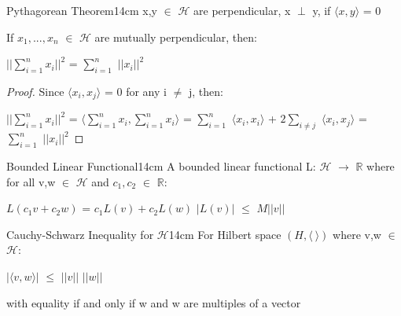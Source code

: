     \vspace{0.5cm}



    \begin{wtheorem}{Pythagorean Theorem}{14cm}
        x,y $\in$ $\mathcal{H}$ are {\color{lblue} perpendicular}, x $\perp$ y,
        if $\langle x , y \rangle$ = 0

        If $x_1,...,x_n$ $\in$ $\mathcal{H}$ are mutually perpendicular, then:

        \hspace{0.5cm}
        $|| \sum_{i=1}^n x_i ||^2$
        = $\sum_{i=1}^n$ $||x_i||^2$
    \end{wtheorem}

    \begin{proof}
        Since $\langle x_i , x_j \rangle$ = 0 for any i $\not =$ j, then:

        \hspace{0.5cm}
        $|| \sum_{i=1}^n x_i ||^2$
        = $\langle \sum_{i=1}^n x_i , \sum_{i=1}^n x_i \rangle$
        = $\sum_{i=1}^n$ $\langle x_i , x_i \rangle$
            + $2 \sum_{i \not = j}$ $\langle x_i , x_j \rangle$
        = $\sum_{i=1}^n$ $||x_i||^2$
    \end{proof}

    \vspace{0.5cm}



    \begin{definition}{Bounded Linear Functional}{14cm}
        A {\color{lblue} bounded linear functional}
        L: $\mathcal{H}$ $\rightarrow$ $\mathbb{R}$
        where for all v,w $\in$ $\mathcal{H}$ and $c_1,c_2$ $\in$ $\mathbb{R}$:

        \hspace{0.5cm}
        $L(c_1v+c_2w)$ = $c_1L(v) + c_2L(w)$
        \hspace{1cm}
        $|L(v)|$ $\leq$ $M||v||$
    \end{definition}

    \vspace{0.5cm}



    \begin{wtheorem}{Cauchy-Schwarz Inequality for $\mathcal{H}$}{14cm}
        For Hilbert space $(H, \langle \ \rangle)$ where v,w $\in$ $\mathcal{H}$:

        \hspace{0.5cm}
        $|\langle v , w \rangle|$
        $\leq$ $||v||$ $||w||$

        with equality if and only if w and w are multiples of a vector
    \end{wtheorem}


